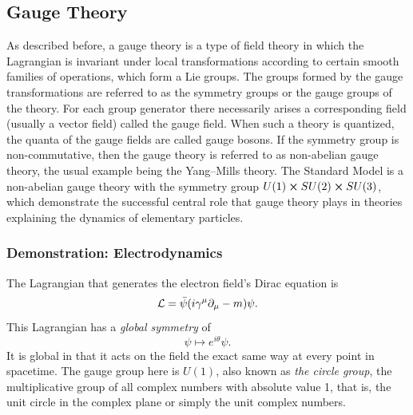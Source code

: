 \subsection{Gauge Theory}
\label{sec:gauge-theory}

As described before, a gauge theory is a type of field theory in which the Lagrangian is invariant under local transformations according to certain smooth families of operations, which form a Lie groups. The groups formed by the gauge transformations are referred to as the symmetry groups or the gauge groups of the theory. For each group generator there necessarily arises a corresponding field (usually a vector field) called the gauge field. When such a theory is quantized, the quanta of the gauge fields are called gauge bosons. If the symmetry group is non-commutative, then the gauge theory is referred to as non-abelian gauge theory, the usual example being the Yang–Mills theory. The Standard Model is a non-abelian gauge theory with the symmetry group $U(1)\cross SU(2)\cross SU(3)$, which demonstrate the successful central role that gauge theory plays in theories explaining the dynamics of elementary particles.

\subsubsection{Demonstration: Electrodynamics}

The Lagrangian that generates the electron field's Dirac equation is
\begin{equation}
\mathcal{L}=\bar{\psi}\qty(i\gamma^{\mu}\partial_{\mu}-m)\psi.
\end{equation}
This Lagrangian has a \emph{global symmetry} of
\begin{equation}
\psi\mapsto e^{i\theta}\psi.
\end{equation}
It is global in that it acts on the field the exact same way at every point in spacetime. The gauge group here is $U(1)$, also known as \emph{the circle group}, the multiplicative group of all complex numbers with absolute value 1, that is, the unit circle in the complex plane or simply the unit complex numbers.

